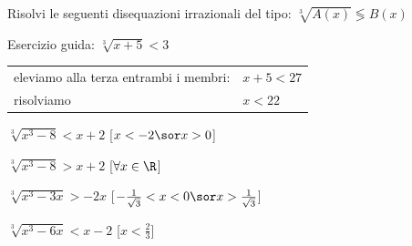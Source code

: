 \begin{esercizio}\label{ese:03.1}
Risolvi le seguenti disequazioni irrazionali del tipo:
\(\sqrt[3]{A(x)} \lessgtr B(x)\)

Esercizio guida: \(\sqrt[3]{x +5} < 3\)
\begin{center}
\begin{tabular}{ll}
eleviamo alla terza entrambi i membri: & \(x +5 < 27\)\\
risolviamo & \(x < 22\)
\end{tabular}
\end{center}

\begin{enumeratea}
\item \(\sqrt[3]{x^3 -8} < x +2 \)
\hfill [\(x<-2 \sor x>0\)]
\item \(\sqrt[3]{x^3 -8} > x +2 \)
\hfill [\(\forall x \in \R\)]
\item \(\sqrt[3]{x^3 -3x} > -2x \)
\hfill [\(-\frac{1}{\sqrt{3}}<x<0 \sor x>\frac{1}{\sqrt{3}}\)]
\item \(\sqrt[3]{x^3 -6x} < x -2 \)
\hfill [\(x< \frac{2}{3}\)]
\end{enumeratea}
\end{esercizio}

